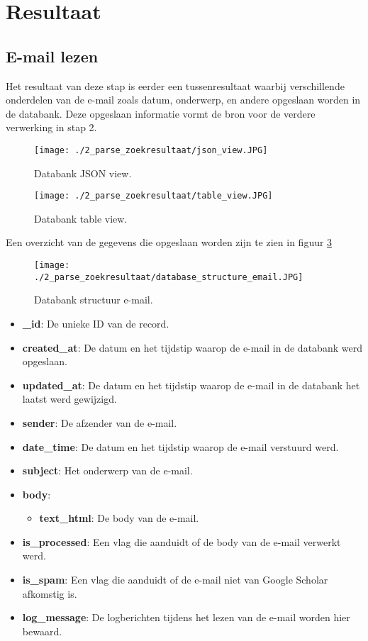 \section{Resultaat}
\subsection{E-mail lezen}
Het resultaat van deze stap is eerder een tussenresultaat waarbij verschillende onderdelen van de e-mail zoals datum, onderwerp, en andere opgeslaan worden in de databank. Deze opgeslaan informatie vormt de bron voor de verdere verwerking in stap 2.
\begin{figure}
    \centering
    \texttt{[image: ./2\_parse\_zoekresultaat/json\_view.JPG]}
    \caption[Databank JSON view.]{\label{fig:Databank JSON view}Databank JSON view.}
\end{figure}
\begin{figure}
    \centering
    \texttt{[image: ./2\_parse\_zoekresultaat/table\_view.JPG]}
    \caption[Databank table view.]{\label{fig:Databank table view}Databank table view.}
\end{figure}
\FloatBarrier
Een overzicht van de gegevens die opgeslaan worden zijn te zien in figuur \ref{fig:databank_structuur_email}
\begin{figure}
    \centering
    \texttt{[image: ./2\_parse\_zoekresultaat/database\_structure\_email.JPG]}
    \caption[Databank structuur e-mail.]{\label{fig:databank_structuur_email}Databank structuur e-mail.}
\end{figure}
\begin{itemize}
    \item \textbf{\_id}: De unieke ID van de record.
    \item \textbf{created\_at}: De datum en het tijdstip waarop de e-mail in de databank werd opgeslaan.
    \item \textbf{updated\_at}: De datum en het tijdstip waarop de e-mail in de databank het laatst werd gewijzigd. 
    \item \textbf{sender}: De afzender van de e-mail.
    \item \textbf{date\_time}: De datum en het tijdstip waarop de e-mail verstuurd werd.
    \item \textbf{subject}: Het onderwerp van de e-mail. 
    \item \textbf{body}: 
        \begin{itemize}
            \item \textbf{text\_html}: De body van de e-mail.
        \end{itemize}
    \item \textbf{is\_processed}: Een vlag die aanduidt of de body van de e-mail verwerkt werd.
    \item \textbf{is\_spam}: Een vlag die aanduidt of de e-mail niet van Google Scholar afkomstig is. 
    \item \textbf{log\_message}: De logberichten tijdens het lezen van de e-mail worden hier bewaard. 
\end{itemize}
\FloatBarrier
